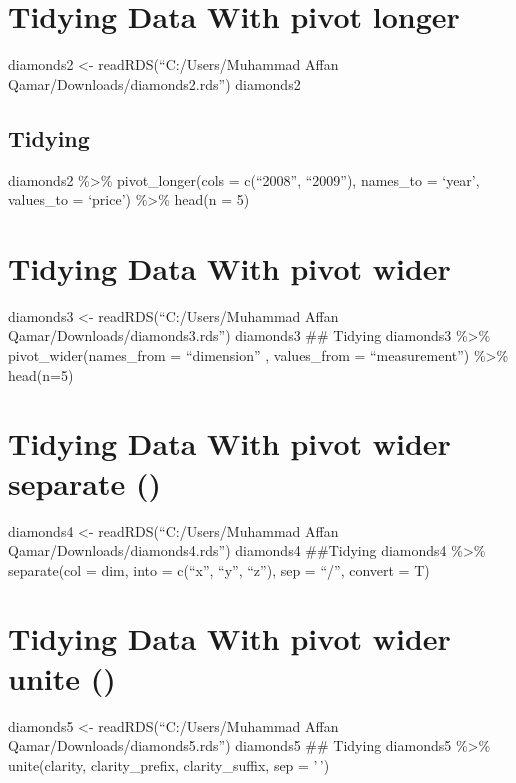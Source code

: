 \documentclass[
]{article}
\begin{document}
\hypertarget{tidying-data-with-pivot-longer}{%
\section{Tidying Data With pivot
longer}\label{tidying-data-with-pivot-longer}}

diamonds2 \textless- readRDS(``C:/Users/Muhammad Affan
Qamar/Downloads/diamonds2.rds'') diamonds2

\hypertarget{tidying}{%
\subsection{Tidying}\label{tidying}}

diamonds2 \%\textgreater\% pivot\_longer(cols = c(``2008'', ``2009''),
names\_to = `year', values\_to = `price') \%\textgreater\% head(n = 5)

\hypertarget{tidying-data-with-pivot-wider}{%
\section{Tidying Data With pivot
wider}\label{tidying-data-with-pivot-wider}}

diamonds3 \textless- readRDS(``C:/Users/Muhammad Affan
Qamar/Downloads/diamonds3.rds'') diamonds3 \#\# Tidying diamonds3
\%\textgreater\% pivot\_wider(names\_from = ``dimension'' , values\_from
= ``measurement'') \%\textgreater\% head(n=5)

\hypertarget{tidying-data-with-pivot-wider-separate}{%
\section{Tidying Data With pivot wider separate
()}\label{tidying-data-with-pivot-wider-separate}}

diamonds4 \textless- readRDS(``C:/Users/Muhammad Affan
Qamar/Downloads/diamonds4.rds'') diamonds4 \#\#Tidying diamonds4
\%\textgreater\% separate(col = dim, into = c(``x'', ``y'', ``z''), sep
= ``/'', convert = T)

\hypertarget{tidying-data-with-pivot-wider-unite}{%
\section{Tidying Data With pivot wider unite
()}\label{tidying-data-with-pivot-wider-unite}}

diamonds5 \textless- readRDS(``C:/Users/Muhammad Affan
Qamar/Downloads/diamonds5.rds'') diamonds5 \#\# Tidying diamonds5
\%\textgreater\% unite(clarity, clarity\_prefix, clarity\_suffix, sep =
'\,')
\end{document}

